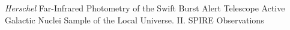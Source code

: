 \textit{Herschel} Far-Infrared Photometry of the Swift Burst Alert Telescope Active Galactic Nuclei Sample of the Local Universe. II. SPIRE Observations
